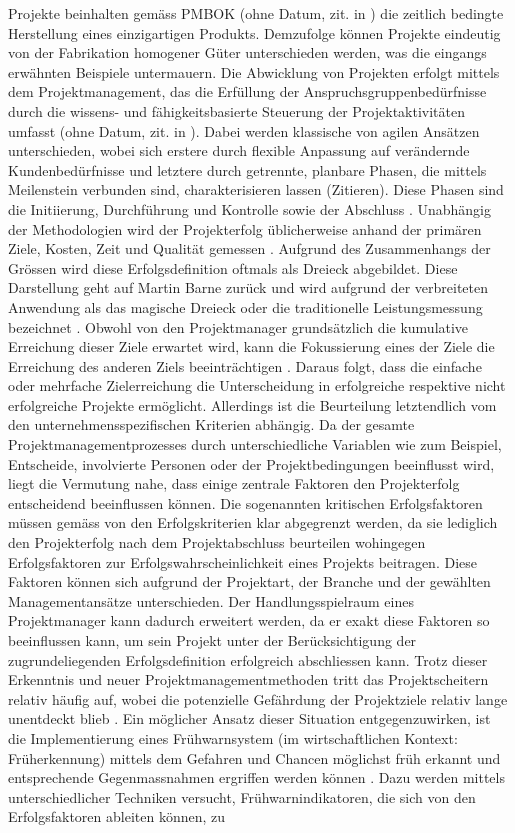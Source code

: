  Projekte beinhalten gemäss PMBOK (ohne Datum, zit. in \citealp[S.~17]{burke10}) die zeitlich bedingte Herstellung eines einzigartigen Produkts. Demzufolge können Projekte eindeutig von der Fabrikation homogener Güter unterschieden werden, was die eingangs erwähnten Beispiele untermauern. Die Abwicklung von Projekten erfolgt mittels dem Projektmanagement, das die Erfüllung der Anspruchsgruppenbedürfnisse durch die wissens- und fähigkeitsbasierte Steuerung der Projektaktivitäten umfasst (ohne Datum, zit. in \citealp[S.~18]{burke10}). Dabei werden klassische von agilen Ansätzen unterschieden, wobei sich erstere durch flexible Anpassung auf verändernde Kundenbedürfnisse und letztere durch getrennte, planbare Phasen, die mittels Meilenstein verbunden sind, charakterisieren lassen (Zitieren). Diese Phasen sind die Initiierung, Durchführung und Kontrolle sowie der Abschluss \citep{pmhodm}. Unabhängig der Methodologien wird der Projekterfolg üblicherweise anhand der primären Ziele, Kosten, Zeit und Qualität gemessen \citep{Atk1999}. Aufgrund des Zusammenhangs der Grössen wird diese Erfolgsdefinition oftmals als Dreieck abgebildet. Diese Darstellung geht auf Martin Barne zurück und wird aufgrund der verbreiteten Anwendung als das magische Dreieck oder die traditionelle Leistungsmessung bezeichnet \citep{kerz14,lock07}. Obwohl von den Projektmanager grundsätzlich die kumulative Erreichung dieser Ziele erwartet wird, kann die Fokussierung eines der Ziele die Erreichung des anderen Ziels beeinträchtigen \citep[S.~21]{lock07}. Daraus folgt, dass die einfache oder mehrfache Zielerreichung die Unterscheidung in erfolgreiche respektive nicht erfolgreiche Projekte ermöglicht. Allerdings ist die Beurteilung letztendlich vom den unternehmensspezifischen Kriterien abhängig. Da der gesamte Projektmanagementprozesses durch unterschiedliche Variablen wie zum Beispiel, Entscheide, involvierte Personen oder der Projektbedingungen beeinflusst wird, liegt die Vermutung nahe, dass einige zentrale Faktoren den Projekterfolg entscheidend beeinflussen können. Die sogenannten kritischen Erfolgsfaktoren müssen gemäss \cite{BeDeNov2015} von den Erfolgskriterien klar abgegrenzt werden, da sie lediglich den Projekterfolg nach dem Projektabschluss beurteilen wohingegen Erfolgsfaktoren zur Erfolgswahrscheinlichkeit eines Projekts beitragen. Diese Faktoren können sich aufgrund der Projektart, der Branche und der gewählten Managementansätze unterschieden. Der Handlungsspielraum eines Projektmanager kann dadurch erweitert werden, da er exakt diese Faktoren so beeinflussen kann, um sein Projekt unter der Berücksichtigung der zugrundeliegenden Erfolgsdefinition erfolgreich abschliessen kann. Trotz dieser Erkenntnis und neuer Projektmanagementmethoden tritt das Projektscheitern relativ häufig auf, wobei die potenzielle Gefährdung der Projektziele relativ lange unentdeckt blieb \citep{WiKlak12,haan13}. Ein möglicher Ansatz dieser Situation entgegenzuwirken, ist die Implementierung eines Frühwarnsystem (im wirtschaftlichen Kontext: Früherkennung) mittels dem Gefahren und Chancen möglichst früh erkannt und entsprechende Gegenmassnahmen ergriffen werden können \citep{haankra13}. Dazu werden mittels unterschiedlicher Techniken versucht, Frühwarnindikatoren, die sich von den Erfolgsfaktoren ableiten können, zu 